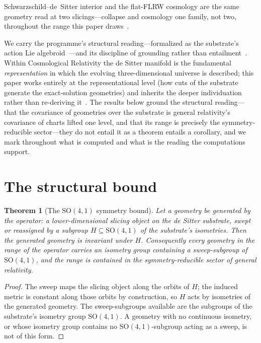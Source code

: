 \documentclass[11pt,a4paper]{article}
\newtheorem{theorem}{Theorem}
\theoremstyle{definition}
\newcommand{\so}{\mathrm{SO}(4,1)}
\begin{document}
Schwarzschild--de~Sitter interior and the flat-FLRW cosmology are the same geometry read at two slicings---collapse and cosmology one family, not two, throughout the range this paper draws~\cite{JanzenCRframework}.

We carry the programme's structural reading---formalized as the substrate's action Lie algebroid~\cite{JanzenAlgebroid}---and its discipline of grounding rather than entailment~\cite{JanzenShadowExistence}. Within Cosmological Relativity the de Sitter manifold is the fundamental \emph{representation} in which the evolving three-dimensional universe is described; this paper works entirely at the representational level (how cuts of the substrate generate the exact-solution geometries) and inherits the deeper individuation rather than re-deriving it~\cite{JanzenCRframework}. The results below ground the structural reading---that the covariance of geometries over the substrate is general relativity's covariance of charts lifted one level, and that its range is precisely the symmetry-reducible sector---they do not entail it as a theorem entails a corollary, and we mark throughout what is computed and what is the reading the computations support.

\section{The structural bound}\label{sec:bound}

\begin{theorem}[The $\so$ symmetry bound]\label{thm:bound}
Let a geometry be generated by the operator: a lower-dimensional slicing object on the de Sitter substrate, swept or reassigned by a subgroup $H\subseteq\so$ of the substrate's isometries. Then the generated geometry is invariant under $H$. Consequently every geometry in the range of the operator carries an isometry group containing a sweep-subgroup of $\so$, and the range is contained in the symmetry-reducible sector of general relativity.
\end{theorem}

\begin{proof}
The sweep maps the slicing object along the orbits of $H$; the induced metric is constant along those orbits by construction, so $H$ acts by isometries of the generated geometry. The sweep-subgroups available are the subgroups of the substrate's isometry group $\so$. A geometry with no continuous isometry, or whose isometry group contains no $\so$-subgroup acting as a sweep, is not of this form.
\end{proof}
\end{document}
